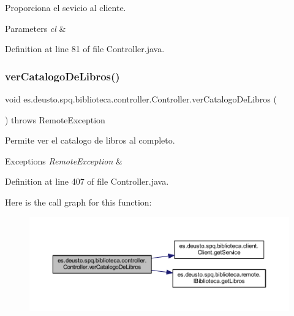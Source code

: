 Proporciona el sevicio al cliente. 
\begin{DoxyParams}{Parameters}
{\em cl} & \\
\hline
\end{DoxyParams}


Definition at line 81 of file Controller.\+java.

\mbox{\label{classes_1_1deusto_1_1spq_1_1biblioteca_1_1controller_1_1_controller_a68f64f2332ad51a02f0d24f322e2fe13}} 
\subsubsection{\texorpdfstring{ver\+Catalogo\+De\+Libros()}{verCatalogoDeLibros()}}
{\footnotesize\ttfamily void es.\+deusto.\+spq.\+biblioteca.\+controller.\+Controller.\+ver\+Catalogo\+De\+Libros (\begin{DoxyParamCaption}{ }\end{DoxyParamCaption}) throws Remote\+Exception}

Permite ver el catalogo de libros al completo. 
\begin{DoxyExceptions}{Exceptions}
{\em Remote\+Exception} & \\
\hline
\end{DoxyExceptions}


Definition at line 407 of file Controller.\+java.

Here is the call graph for this function\+:
\nopagebreak
\begin{figure}[H]
\begin{center}
\leavevmode
\includegraphics[width=350pt]{classes_1_1deusto_1_1spq_1_1biblioteca_1_1controller_1_1_controller_a68f64f2332ad51a02f0d24f322e2fe13_cgraph}
\end{center}
\end{figure}
\mbox{\label{classes_1_1deusto_1_1spq_1_1biblioteca_1_1controller_1_1_controller_a33b36798ff65a516ecf45f872cb09235}} 
